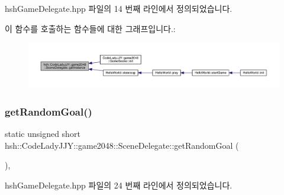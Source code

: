 hsh\+Game\+Delegate.\+hpp 파일의 14 번째 라인에서 정의되었습니다.

이 함수를 호출하는 함수들에 대한 그래프입니다.\+:
\nopagebreak
\begin{figure}[H]
\begin{center}
\leavevmode
\includegraphics[width=350pt]{classhsh_1_1_code_lady_j_j_y_1_1game2048_1_1_scene_delegate_a332a574da455fb687b5d283399a6976c_icgraph}
\end{center}
\end{figure}
\mbox{\label{classhsh_1_1_code_lady_j_j_y_1_1game2048_1_1_scene_delegate_abb107cf268a50b3ebd9bd545c88a9a35}} 
\subsubsection{\texorpdfstring{get\+Random\+Goal()}{getRandomGoal()}}
{\footnotesize\ttfamily static unsigned short hsh\+::\+Code\+Lady\+J\+J\+Y\+::game2048\+::\+Scene\+Delegate\+::get\+Random\+Goal (\begin{DoxyParamCaption}{ }\end{DoxyParamCaption})\hspace{0.3cm}{\ttfamily [inline]}, {\ttfamily [static]}}



hsh\+Game\+Delegate.\+hpp 파일의 24 번째 라인에서 정의되었습니다.

